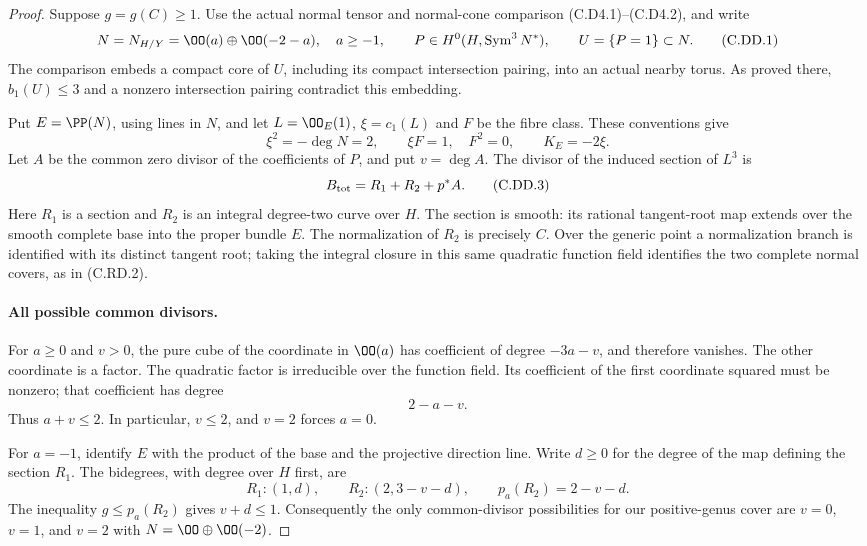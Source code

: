 \begin{proof}
Suppose $g=g(C)\ge1$. Use the actual normal tensor and
normal-cone comparison (C.D4.1)--(C.D4.2), and write
\[
 N=N_{H/Y}=\OO(a)\oplus\OO(-2-a),\quad a\ge-1,
 \qquad P\in H^0(H,\operatorname{Sym}^3N^*),
 \qquad U=\{P=1\}\subset N.
\tag{C.DD.1}
\]
The comparison embeds a compact core of $U$, including
its compact intersection pairing, into an actual nearby
torus. As proved there, $b_1(U)\le3$ and a nonzero
intersection pairing contradict this embedding.

Put $E=\PP(N)$, using lines in $N$, and let
$L=\OO_E(1)$, $\xi=c_1(L)$ and $F$ be the fibre class.
These conventions give
\[
 \xi^2=-\deg N=2,\qquad \xi F=1,\quad F^2=0,
 \qquad K_E=-2\xi.
\tag{C.DD.2}
\]
Let $A$ be the common zero divisor of the coefficients
of $P$, and put $v=\deg A$. The divisor of the induced
section of $L^3$ is
\[
                    B_{\rm tot}=R_1+R_2+p^*A.
\tag{C.DD.3}
\]
Here $R_1$ is a section and $R_2$ is an integral
degree-two curve over $H$. The section is smooth:
its rational tangent-root map extends over the smooth
complete base into the proper bundle $E$.
The normalization of $R_2$ is precisely $C$. Over the
generic point a normalization branch is identified
with its distinct tangent root; taking the integral
closure in this same quadratic function field identifies
the two complete normal covers, as in (C.RD.2).

\paragraph{All possible common divisors.}
For $a\ge0$ and $v>0$, the pure cube of the coordinate
in $\OO(a)$ has coefficient of degree $-3a-v$, and
therefore vanishes. The other coordinate is a factor.
The quadratic factor is irreducible over the function
field. Its coefficient of the first coordinate squared
must be nonzero; that coefficient has degree
\[
                              2-a-v.
\tag{C.DD.4}
\]
Thus $a+v\le2$. In particular, $v\le2$, and $v=2$
forces $a=0$.

For $a=-1$, identify $E$ with the product of the base
and the projective direction line. Write $d\ge0$ for
the degree of the map defining the section $R_1$.
The bidegrees, with degree over $H$ first, are
\[
 R_1:(1,d),\qquad R_2:(2,3-v-d),\qquad
 p_a(R_2)=2-v-d.
\tag{C.DD.5}
\]
The inequality $g\le p_a(R_2)$ gives $v+d\le1$.
Consequently the only common-divisor possibilities
for our positive-genus cover are $v=0$, $v=1$, and
$v=2$ with $N=\OO\oplus\OO(-2)$.


\end{proof}
